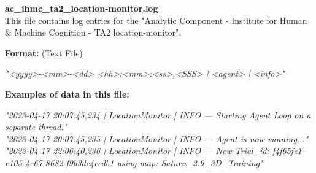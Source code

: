 \begin{description}
\begin{addmargin}[0em]{0em}
    \label{ac_ihmc_ta2_location-monitor.log}
    \begin{addmargin}[1em]{0em} %
        \textbf{ac\_ihmc\_ta2\_location-monitor.log}\\
        This file contains log entries for the "Analytic Component - Institute for Human \& Machine Cognition - TA2 location-monitor".
        \begin{addmargin}[1em]{0em}
            \textbf{Format:} (Text File)
            \begin{addmargin}[1em]{0em}
                \textit{"<yyyy>-<mm>-<dd> <hh>:<mm>:<ss>,<SSS> | <agent> | <info>"}
            \end{addmargin}
        \end{addmargin}
        \begin{addmargin}[1em]{0em}
            \textbf{Examples of data in this file:}
            \begin{addmargin}[1em]{0em}\textit{"2023-04-17 20:07:45,234 | LocationMonitor | INFO — Starting Agent Loop on a separate thread."\\
                "2023-04-17 20:07:45,235 | LocationMonitor | INFO — Agent is now running..."\\
                "2023-04-17 22:06:40,236 | LocationMonitor | INFO — New Trial\_id: f4f65fe1-e105-4e67-8682-f9b3dc4eedb1 using map: Saturn\_2.9\_3D\_Training"}
            \end{addmargin}
        \end{addmargin}
    \end{addmargin} %
    \textbf{\\}


\end{addmargin}
\end{description}
